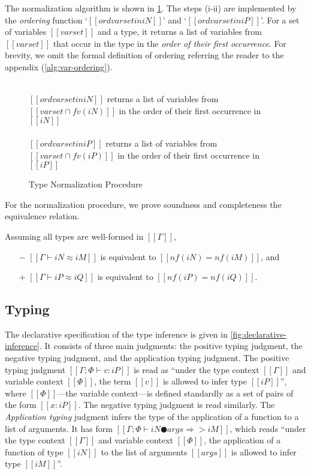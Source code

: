 The normalization algorithm is shown in \cref{fig:type-nf}. The steps (i-ii) are
implemented by the \emph{ordering} function `$[[ord varset in iN]]$' and `$[[ord
varset in iP]]$'. For a set of variables $[[varset]]$ and a type, it returns a
list of variables from $[[varset]]$ that occur in the type in the \emph{order of
their first occurrence}. For brevity, we omit the formal definition of ordering
referring the reader to the appendix (\cref{alg:var-ordering}).

\begin{figure}[t]
  
  \begin{multicols}{2}
  \ottdefnNrmNNormLabeled{}
  \\
  $[[ord varset in iN]]$ returns a list of variables from 
  $[[varset ∩ fv(iN)]]$ in the order of their first occurrence in $[[iN]]$
  \columnbreak\\
  \ottdefnNrmPNormLabeled{}
  \\
  $[[ord varset in iP]]$ returns a list of variables from 
  $[[varset ∩ fv(iP)]]$ in the order of their first occurrence in $[[iP]]$
  \end{multicols}


  \caption{Type Normalization Procedure} 
  \label{fig:type-nf}
\end{figure}


For the normalization procedure, 
we prove soundness and completeness \wrt the equivalence relation.
\begin{property}
  Assuming all types are well-formed in $[[Γ]]$,
  \begin{itemize}
    \item[$-$] $[[Γ ⊢ iN ≈ iM]]$ is equivalent to $[[nf(iN) = nf(iM)]]$, and
    \item[$+$] $[[Γ ⊢ iP ≈ iQ]]$ is equivalent to $[[nf(iP) = nf(iQ)]]$.
  \end{itemize}
\end{property}


\subsection{Typing}

The declarative specification of the type inference is given in 
\cref{fig:declarative-inference}.
It consists of three main judgments: the positive typing judgment,
the negative typing judgment, and the application typing judgment.
The positive typing judgment $[[Γ ; Φ ⊢ v : iP]]$ is read as 
``under the type context $[[Γ]]$ and variable context $[[Φ]]$,
the term $[[v]]$ is allowed to infer type $[[iP]]$'',
where $[[Φ]]$---the variable context---is defined standardly as
a set of pairs of the form $[[x : iP]]$. 
The negative typing judgment is read similarly.
The \emph{Application typing} judgment
infers the type of the application of a function to a list of arguments.
It has form $[[Γ ; Φ ⊢ iN ● args ⇒> iM]]$, 
which reads ``under the type context $[[Γ]]$ and variable context $[[Φ]]$,
the application of a function of type $[[iN]]$ to the list of arguments $[[args]]$
is allowed to infer type $[[iM]]$''.

